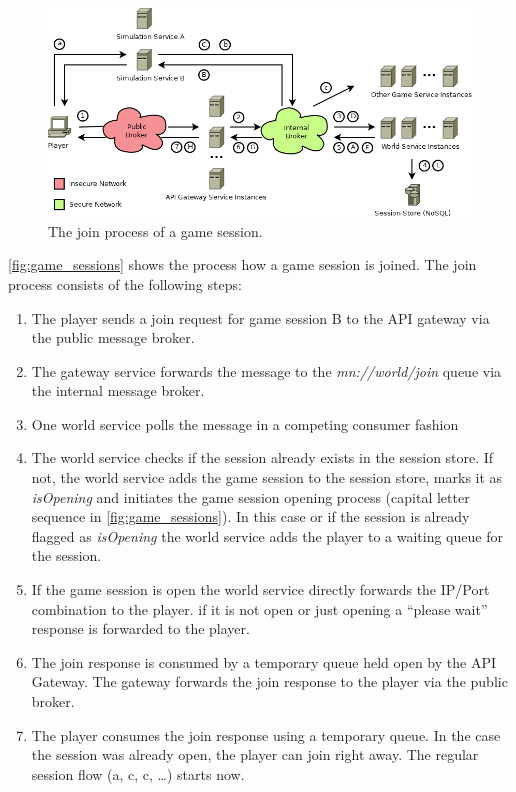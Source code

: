 \begin{figure}
	\centering
  	\includegraphics[width=\textwidth]{images/architecture/GameSessions}
	\caption{The join process of a game session.}
	\label{fig:game_sessions}
\end{figure}

\autoref{fig:game_sessions} shows the process how a game session is joined.
The join process consists of the following steps:

\begin{enumerate}
  \item The player sends a join request for game session B to the API gateway
  via the public message broker.
  \item The gateway service forwards the message to the \textit{mn://world/join}
  queue via the internal message broker.
  \item One world service polls the message in a competing consumer fashion
  \item The world service checks if the session already exists in the session
  store. If not, the world service adds the game session to the session store,
  marks it as \textit{isOpening} and initiates the game session opening process (capital
  letter sequence in \autoref{fig:game_sessions}). In this case or if the
  session is already flagged as \textit{isOpening} the world service adds the
  player to a waiting queue for the session.
  \item If the game session is open the world service directly
  forwards the IP/Port combination to the player.  if it is not open or
  just opening a ``please wait'' response is forwarded to the player.
  \item The join response is consumed by a temporary queue held open by the API
  Gateway. The gateway forwards the join response to the player via the public
  broker.
  \item The player consumes the join response using a temporary queue. In the
  case the session was already open, the player can join right away. The regular
  session flow (a, c, c, \ldots) starts now.
\end{enumerate}


